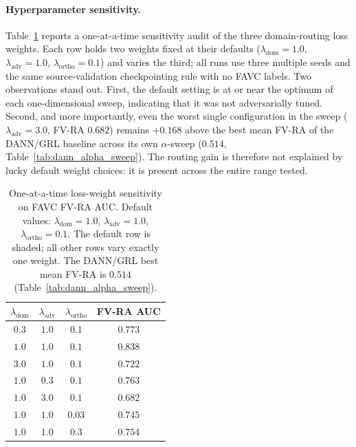 \documentclass{article}
\begin{document}
\paragraph{Hyperparameter sensitivity.}
Table~\ref{tab:sensitivity_sweep} reports a one-at-a-time sensitivity audit of the three domain-routing loss weights. Each row holds two weights fixed at their defaults ($\lambda_{\mathrm{dom}}{=}1.0$, $\lambda_{\mathrm{adv}}{=}1.0$, $\lambda_{\mathrm{ortho}}{=}0.1$) and varies the third; all runs use three multiple seeds and the same source-validation checkpointing rule with no FAVC labels. Two observations stand out. First, the default setting is at or near the optimum of each one-dimensional sweep, indicating that it was not adversarially tuned. Second, and more importantly, even the worst single configuration in the sweep ($\lambda_{\mathrm{adv}}{=}3.0$, FV-RA $0.682$) remains $+0.168$ above the best mean FV-RA of the DANN/GRL baseline across its own $\alpha$-sweep ($0.514$, Table~\ref{tab:dann_alpha_sweep}). The routing gain is therefore not explained by lucky default weight choices: it is present across the entire range tested.

\begin{table}[h]
    \centering
    \caption{One-at-a-time loss-weight sensitivity on FAVC FV-RA AUC. Default values: $\lambda_{\mathrm{dom}}{=}1.0$, $\lambda_{\mathrm{adv}}{=}1.0$, $\lambda_{\mathrm{ortho}}{=}0.1$. The default row is shaded; all other rows vary exactly one weight. The DANN/GRL best mean FV-RA is $0.514$ (Table~\ref{tab:dann_alpha_sweep}).}
    \label{tab:sensitivity_sweep}
    \small
    \begin{tabular}{ccc|c}
        \toprule
        $\lambda_{\mathrm{dom}}$ & $\lambda_{\mathrm{adv}}$ & $\lambda_{\mathrm{ortho}}$ & \textbf{FV-RA AUC} \\
        \midrule
        $0.3$ & $1.0$ & $0.1$ & $0.773$ \\
        \rowcolor[gray]{0.92} $1.0$ & $1.0$ & $0.1$ & $\mathbf{0.838}$ \\
        $3.0$ & $1.0$ & $0.1$ & $0.722$ \\
        \midrule
        $1.0$ & $0.3$ & $0.1$ & $0.763$ \\
        $1.0$ & $3.0$ & $0.1$ & $0.682$ \\
        \midrule
        $1.0$ & $1.0$ & $0.03$ & $0.745$ \\
        $1.0$ & $1.0$ & $0.3$  & $0.754$ \\
        \bottomrule
    \end{tabular}
\end{table}
\end{document}

